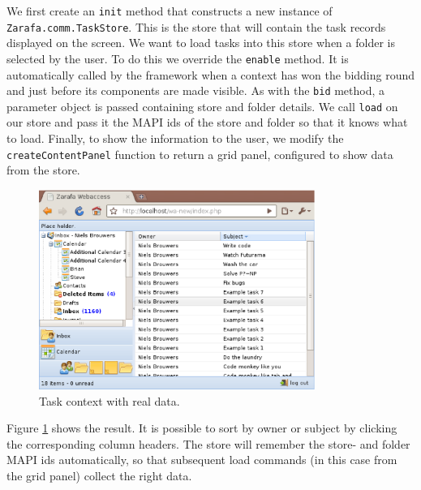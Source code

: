 We first create an {\tt init} method that constructs a new instance of 
{\tt Zarafa.comm.TaskStore}. This is the store that will contain the task records displayed on the screen.
We want to load tasks into this store when a folder is selected by the user. To do this we
override the {\tt enable} method. It is automatically called by the framework when a context has
won the bidding round and just before its components are made visible. 
As with the {\tt bid} method, a parameter object is passed containing store and folder details.
We call {\tt load} on our store and pass it the MAPI ids of the store and folder so that it knows what to load.
Finally, to show the information to the user, we modify the {\tt createContentPanel} function to return a grid
panel, configured to show data from the store. 

\begin{figure}[h!]
\centering
\includegraphics[width=9cm]{figures/taskcontext2.eps}
\caption{Task context with real data.}
\label{figure:taskcontext2}
\end{figure}

Figure \ref{figure:taskcontext2} shows the result. It is possible to sort by owner or subject by clicking the
corresponding column headers. The store will remember the store- and folder MAPI ids automatically, so that
subsequent load commands (in this case from the grid panel) collect the right data.



